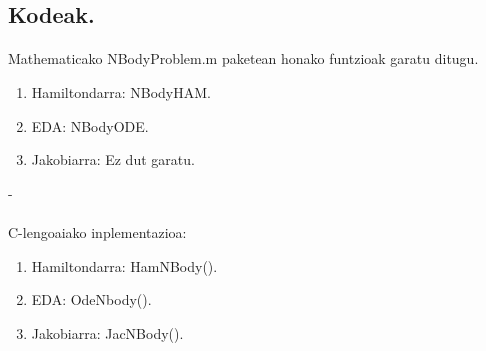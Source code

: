                  
\subsection{Kodeak.}

\paragraph*{} Mathematicako NBodyProblem.m paketean honako funtzioak garatu ditugu.

\begin{enumerate}
   \item Hamiltondarra: NBodyHAM.
   \item EDA: NBodyODE.
   \item Jakobiarra: Ez dut garatu.
\end{enumerate}

-\paragraph*{} C-lengoaiako inplementazioa:

\begin{enumerate}
   \item Hamiltondarra: HamNBody().
   \item EDA: OdeNbody().
   \item Jakobiarra: JacNBody().
\end{enumerate}



